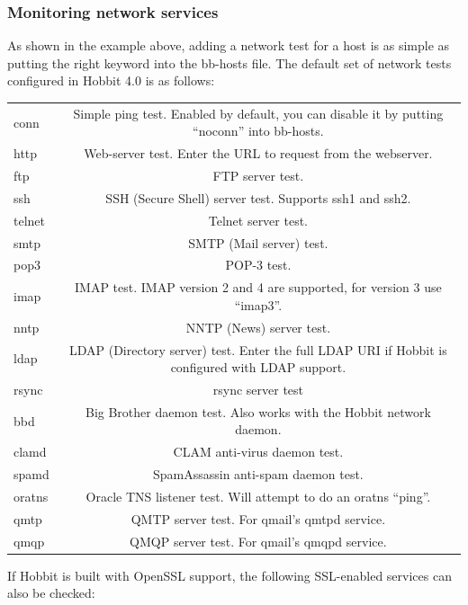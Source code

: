 \subsubsection{Monitoring network services}


 As shown in the example above, adding a network test for a host is as simple as putting the right keyword into the bb-hosts file. The default set of network tests configured in Hobbit 4.0 is as follows:


\begin{tabular}{lc}
conn &Simple ping test. Enabled by default, you can disable it by putting ``noconn'' into bb-hosts. \\
http &Web-server test. Enter the URL to request from the webserver. \\
ftp &FTP server test. \\
ssh &SSH (Secure Shell) server test. Supports ssh1 and ssh2. \\
telnet &Telnet server test. \\
smtp &SMTP (Mail server) test. \\
pop3 &POP-3 test. \\
imap &IMAP test. IMAP version 2 and 4 are supported, for version 3 use ``imap3''. \\
nntp &NNTP (News) server test. \\
ldap &LDAP (Directory server) test. Enter the full LDAP URI if Hobbit is configured with LDAP support. \\
rsync &rsync server test \\
bbd &Big Brother daemon test. Also works with the Hobbit network daemon. \\
clamd &CLAM anti-virus daemon test. \\
spamd &SpamAssassin anti-spam daemon test. \\
oratns &Oracle TNS listener test. Will attempt to do an oratns ``ping''. \\
qmtp &QMTP server test. For qmail's qmtpd service. \\
qmqp &QMQP server test. For qmail's qmqpd service.

\end{tabular}



 If Hobbit is built with OpenSSL support, the following SSL-enabled services can also be checked:


